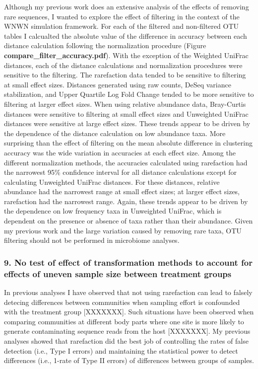 \documentclass[
]{article}
\begin{document}
Although my previous work does an extensive analysis of the effects of
removing rare sequences, I wanted to explore the effect of filtering in
the context of the WNWN simulation framework. For each of the filtered
and non-filtered OTU tables I calcualted the absolute value of the
difference in accuracy between each distance calculation following the
normalization procedure (Figure \textbf{compare\_filter\_accuracy.pdf}).
With the exception of the Weighted UniFrac distances, each of the
distance calculations and normalization procedures were sensitive to the
filtering. The rarefaction data tended to be sensitive to filtering at
small effect sizes. Distances generated using raw counts, DeSeq variance
stabilization, and Upper Quartile Log Fold Change tended to be more
sensitive to filtering at larger effect sizes. When using relative
abundance data, Bray-Curtis distances were sensitive to filtering at
small effect sizes and Unweighted UniFrac distances were sensitive at
large effect sizes. These trends appear to be driven by the dependence
of the distance calculation on low abundance taxa. More surprising than
the effect of filtering on the mean absolute difference in clustering
accuracy was the wide variation in accuracies at each effect size. Among
the different normalization methods, the accuracies calculated using
rarefaction had the narrowest 95\% confidence interval for all distance
calculations except for calculating Unweighted UniFrac distances. For
these distances, relative abundance had the narrowest range at small
effect sizes; at larger effect sizes, rarefaction had the narrowest
range. Again, these trends appear to be driven by the dependence on low
frequency taxa in Unweighted UniFrac, which is dependent on the presence
or absence of taxa rather than their abundance. Given my previous work
and the large variation caused by removing rare taxa, OTU filtering
should not be performed in microbiome analyses.

\hypertarget{no-test-of-effect-of-transformation-methods-to-account-for-effects-of-uneven-sample-size-between-treatment-groups}{%
\subsubsection{9. No test of effect of transformation methods to account
for effects of uneven sample size between treatment
groups}\label{no-test-of-effect-of-transformation-methods-to-account-for-effects-of-uneven-sample-size-between-treatment-groups}}

In previous analyses I have observed that not using rarefaction can lead
to falsely detecing differences between communities when sampling effort
is confounded with the treatment group {[}XXXXXXX{]}. Such situations
have been observed when comparing communities at different body parts
where one site is more likely to generate contaminating sequence reads
from the host {[}XXXXXXX{]}. My previous analyses showed that
rarefaction did the best job of controlling the rates of false detection
(i.e., Type I errors) and maintaining the statistical power to detect
differences (i.e., 1-rate of Type II errors) of differences between
groups of samples.
\end{document}
